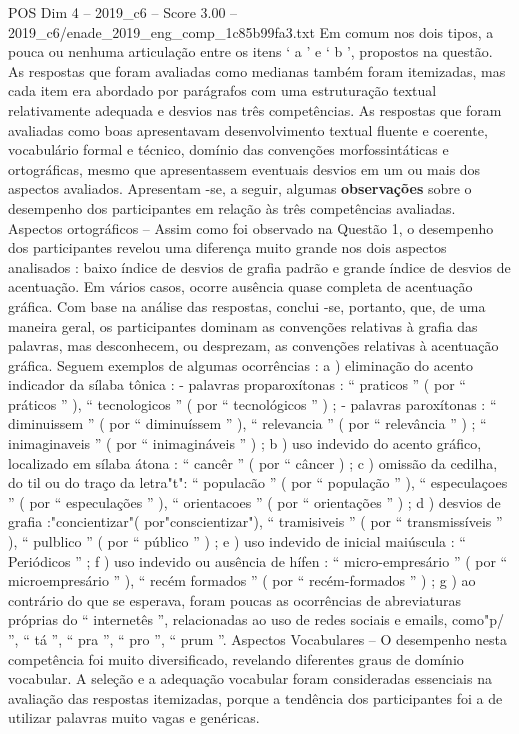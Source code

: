 \begin{textsample}{POS Dim 4 – 2019\_c6 – Score 3.00 – 2019\_c6/enade\_2019\_eng\_comp\_1c85b99fa3.txt}
Em comum nos dois tipos, a pouca ou nenhuma articulação entre os itens ‘ a ’ e ‘ b ’, propostos na questão.
As respostas que foram avaliadas como medianas também foram itemizadas, mas cada item era abordado por parágrafos com uma estruturação textual relativamente adequada e desvios nas três competências.
As respostas que foram avaliadas como boas apresentavam desenvolvimento textual fluente e coerente, vocabulário formal e técnico, domínio das convenções morfossintáticas e ortográficas, mesmo que apresentassem eventuais desvios em um ou mais dos aspectos avaliados.
Apresentam -se, a seguir, algumas \textbf{observações} sobre o desempenho dos participantes em relação às três competências avaliadas.
Aspectos ortográficos – Assim como foi observado na Questão 1, o desempenho dos participantes revelou uma diferença muito grande nos dois aspectos analisados : baixo índice de desvios de grafia padrão e grande índice de desvios de acentuação.
Em vários casos, ocorre ausência quase completa de acentuação gráfica.
Com base na análise das respostas, conclui -se, portanto, que, de uma maneira geral, os participantes dominam as convenções relativas à grafia das palavras, mas desconhecem, ou desprezam, as convenções relativas à acentuação gráfica.
Seguem exemplos de algumas ocorrências : a ) eliminação do acento indicador da sílaba tônica : - palavras proparoxítonas : “ praticos ” ( por “ práticos ” ), “ tecnologicos ” ( por “ tecnológicos ” ) ; - palavras paroxítonas : “ diminuissem ” ( por “ diminuíssem ” ), “ relevancia ” ( por “ relevância ” ) ; “ inimaginaveis ” ( por “ inimagináveis ” ) ; b ) uso indevido do acento gráfico, localizado em sílaba átona : “ cancêr ” ( por “ câncer ) ; c ) omissão da cedilha, do til ou do traço da letra"t": “ populacão ” ( por “ população ” ), “ especulaçoes ” ( por “ especulações ” ), “ orientacoes ” ( por “ orientações ” ) ; d ) desvios de grafia :"concientizar"( por"conscientizar"), “ tramisiveis ” ( por “ transmissíveis ” ), “ pulblico ” ( por “ público ” ) ; e ) uso indevido de inicial maiúscula : “ Periódicos ” ; f ) uso indevido ou ausência de hífen : “ micro-empresário ” ( por “ microempresário ” ), “ recém formados ” ( por “ recém-formados ” ) ; g ) ao contrário do que se esperava, foram poucas as ocorrências de abreviaturas próprias do “ internetês ”, relacionadas ao uso de redes sociais e emails, como"p/ ”, “ tá ”, “ pra ”, “ pro ”, “ prum ”.
Aspectos Vocabulares – O desempenho nesta competência foi muito diversificado, revelando diferentes graus de domínio vocabular.
A seleção e a adequação vocabular foram consideradas essenciais na avaliação das respostas itemizadas, porque a tendência dos participantes foi a de utilizar palavras muito vagas e genéricas.

\end{textsample}
